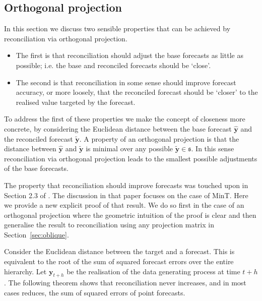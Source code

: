 \documentclass[12pt]{article}
\theoremstyle{definition}
\begin{document}
\subsection{Orthogonal projection}\label{sec:orthogonal}

In this section we discuss two sensible properties that can be achieved by reconciliation via orthogonal projection.
\begin{itemize}
\item The first is that reconciliation should adjust the base forecasts as little as possible; i.e. the base and reconciled forecasts should be `close'.
\item The second is that reconciliation in some sense should improve forecast accuracy, or more loosely, that the reconciled forecast should be `closer' to the realised value targeted by the forecast.
\end{itemize}

To address the first of these properties we make the concept of closeness more concrete, by considering the Euclidean distance between the base forecast $\hat{\bm{y}}$ and the reconciled forecast $\tilde{\bm{y}}$. A property of an orthogonal projection is that the distance between $\hat{\bm{y}}$ and $\tilde{\bm{y}}$ is minimal over any possible $\tilde{\bm{y}}\in\mathfrak{s}$. In this sense reconciliation via orthogonal projection leads to the smallest possible adjustments of the base forecasts.

The property that reconciliation should improve forecasts was touched upon in Section 2.3 of \citet{WicEtAl2019}. The discussion in that paper focuses on the case of MinT\@. Here we provide a new explicit proof of that result. We do so first in the case of an orthogonal projection where the geometric intuition of the proof is clear and then generalise the result to reconciliation using any projection matrix in Section~\ref{sec:oblique}.

Consider the Euclidean distance between the target and a forecast. This is equivalent to the root of the sum of squared forecast errors over the entire hierarchy. Let $\bm{y}_{t+h}$ be the realisation of the data generating process at time $t+h$. The following theorem shows that reconciliation never increases, and in most cases reduces, the sum of squared errors of point forecasts.
\end{document}
